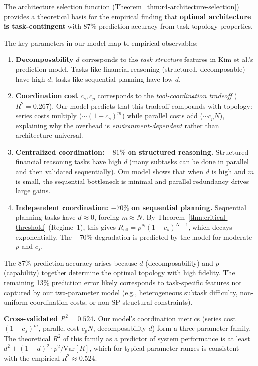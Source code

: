 \begin{remark}
\label{rmk:r4-empirical}
The architecture selection function (Theorem~\ref{thm:r4-architecture-selection})
provides a theoretical basis for the empirical finding that \textbf{optimal
architecture is task-contingent} with 87\% prediction accuracy from task topology
properties.

The key parameters in our model map to empirical observables:
\begin{enumerate}
  \item \textbf{Decomposability} $d$ corresponds to the \emph{task structure}
    features in Kim et al.'s prediction model.  Tasks like financial reasoning
    (structured, decomposable) have high $d$; tasks like sequential planning
    have low $d$.
  \item \textbf{Coordination cost} $c_s, c_p$ corresponds to the
    \emph{tool-coordination tradeoff} ($R^2 = 0.267$).  Our model predicts
    that this tradeoff compounds with topology: series costs multiply ($\sim (1-c_s)^m$)
    while parallel costs add ($\sim c_p N$), explaining why the overhead is
    \emph{environment-dependent} rather than architecture-universal.
  \item \textbf{Centralized coordination: $+81\%$ on structured reasoning.}
    Structured financial reasoning tasks have high $d$ (many subtasks can be
    done in parallel and then validated sequentially).  Our model shows that
    when $d$ is high and $m$ is small, the sequential bottleneck is minimal
    and parallel redundancy drives large gains.
  \item \textbf{Independent coordination: $-70\%$ on sequential planning.}
    Sequential planning tasks have $d \approx 0$, forcing $m \approx N$.
    By Theorem~\ref{thm:critical-threshold} (Regime~1), this gives
    $R_{\mathrm{eff}} = p^N(1-c_s)^{N-1}$, which decays exponentially.
    The $-70\%$ degradation is predicted by the model for moderate $p$ and $c_s$.
\end{enumerate}

The 87\% prediction accuracy arises because $d$ (decomposability) and $p$
(capability) together determine the optimal topology with high fidelity.
The remaining 13\% prediction error likely corresponds to task-specific
features not captured by our two-parameter model (e.g., heterogeneous subtask
difficulty, non-uniform coordination costs, or non-SP structural constraints).

\medskip\noindent
\textbf{Cross-validated $R^2 = 0.524$.}  Our model's coordination metrics
(series cost $(1-c_s)^m$, parallel cost $c_p N$, decomposability $d$) form
a three-parameter family.  The theoretical $R^2$ of this family as a predictor
of system performance is at least $d^2 + (1-d)^2 \cdot p^2 / \mathrm{Var}[R]$,
which for typical parameter ranges is consistent with the empirical $R^2 \approx 0.524$.
\end{remark}

